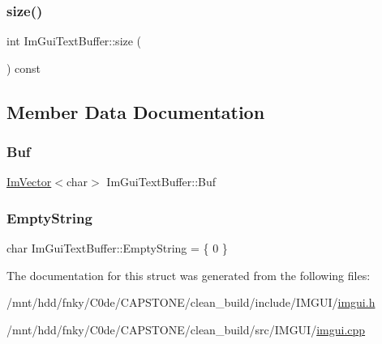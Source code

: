 \mbox{\label{structImGuiTextBuffer_a2811fcd43e0224eb3bd0f3464b634289}} 
\subsubsection{\texorpdfstring{size()}{size()}}
{\footnotesize\ttfamily int Im\+Gui\+Text\+Buffer\+::size (\begin{DoxyParamCaption}{ }\end{DoxyParamCaption}) const\hspace{0.3cm}{\ttfamily [inline]}}



\subsection{Member Data Documentation}
\mbox{\label{structImGuiTextBuffer_aa6de034b1920cdae5505cc58abf14240}} 
\subsubsection{\texorpdfstring{Buf}{Buf}}
{\footnotesize\ttfamily \hyperlink{structImVector}{Im\+Vector}$<$char$>$ Im\+Gui\+Text\+Buffer\+::\+Buf}

\mbox{\label{structImGuiTextBuffer_a471f810a368ec5f4a8ee12c407330c35}} 
\subsubsection{\texorpdfstring{Empty\+String}{EmptyString}}
{\footnotesize\ttfamily char Im\+Gui\+Text\+Buffer\+::\+Empty\+String = \{ 0 \}\hspace{0.3cm}{\ttfamily [static]}}



The documentation for this struct was generated from the following files\+:\begin{DoxyCompactItemize}
\item 
/mnt/hdd/fnky/\+C0de/\+C\+A\+P\+S\+T\+O\+N\+E/clean\+\_\+build/include/\+I\+M\+G\+U\+I/\hyperlink{imgui_8h}{imgui.\+h}\item 
/mnt/hdd/fnky/\+C0de/\+C\+A\+P\+S\+T\+O\+N\+E/clean\+\_\+build/src/\+I\+M\+G\+U\+I/\hyperlink{imgui_8cpp}{imgui.\+cpp}\end{DoxyCompactItemize}
